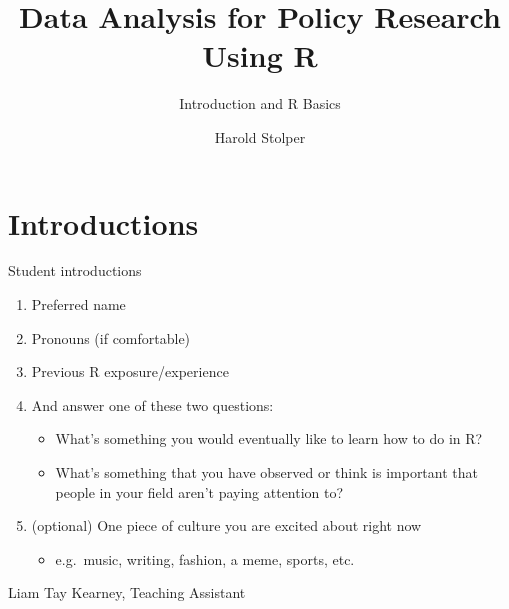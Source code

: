 \documentclass[
  8pt,
  ignorenonframetext,
  dvipsnames]{beamer}
\title{Data Analysis for Policy Research Using R}
\subtitle{Introduction and R Basics}
\author{Harold Stolper}
\date{}
\providecommand{\tightlist}{%
  \setlength{\itemsep}{0pt}\setlength{\parskip}{0pt}}
\let\olditem\item
\renewcommand{\item}{%
  \olditem\vspace{4pt}
}
\begin{document}
\frame{\titlepage}

\begin{frame}[allowframebreaks]
  \tableofcontents[hideallsubsections]
\end{frame}
\hypertarget{introductions}{%
\section{Introductions}\label{introductions}}

\begin{frame}{Student introductions}
\protect\hypertarget{student-introductions}{}
\begin{enumerate}
\tightlist
\item
  Preferred name
\item
  Pronouns (if comfortable)
\item
  Previous R exposure/experience
\item
  And answer one of these two questions:

  \begin{itemize}
  \tightlist
  \item
    What's something you would eventually like to learn how to do in R?
  \item
    What's something that you have observed or think is important that
    people in your field aren't paying attention to?
  \end{itemize}
\item
  (optional) One piece of culture you are excited about right now

  \begin{itemize}
  \tightlist
  \item
    e.g.~music, writing, fashion, a meme, sports, etc.
  \end{itemize}
\end{enumerate}
\end{frame}

\begin{frame}{Liam Tay Kearney, Teaching Assistant}
\protect\hypertarget{liam-tay-kearney-teaching-assistant}{}
\end{frame}
\end{document}
